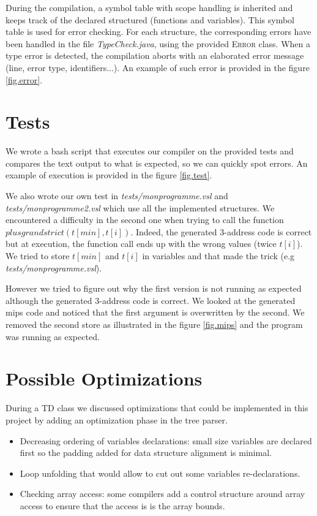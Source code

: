 \documentclass[a4paper,11pt,english]{article}
\begin{document}
During the compilation, a symbol table with scope handling is inherited and keeps track of the declared structured (functions and variables).
This symbol table is used for error checking.
For each structure, the corresponding errors have been handled in the file \textit{TypeCheck.java}, using the provided \textsc{Error} class.
When a type error is detected, the compilation aborts with an elaborated error message (line, error type, identifiers...).
An example of such error is provided in the figure \ref{fig.error}.

\section{Tests}
\label{sec.test}
We wrote a bash script that executes our compiler on the provided tests and compares the text output to what is expected, so we can quickly spot errors. An example of execution is provided in the figure \ref{fig.test}.

We also wrote our own test in \textit{tests/monprogramme.vsl} and \textit{tests/monprogramme2.vsl} which use all the implemented structures.
We encountered a difficulty in the second one when trying to call the function $plusgrandstrict(t[min], t[i])$.
Indeed, the generated 3-address code is correct but at execution, the function call ends up with the wrong values (twice $t[i]$).
We tried to store $t[min]$ and $t[i]$ in variables and that made the trick (e.g \textit{tests/monprogramme.vsl}).

However we tried to figure out why the first version is not running as expected although the generated 3-address code is correct.
We looked at the generated mips code and noticed that the first argument is overwritten by the second.
We removed the second store as illustrated in the figure \ref{fig.mips} and the program was running as expected. 

\section{Possible Optimizations}
During a TD class we discussed optimizations that could be implemented in this project by adding an optimization phase in the tree parser.
\begin{itemize}
 \item Decreasing ordering of variables declarations: small size variables are declared first so the padding added for data structure alignment is minimal.
 \item Loop unfolding that would allow to cut out some variables re-declarations.
 \item Checking array access: some compilers add a control structure around array access to ensure that the access is is the array bounds. 
\end{itemize}
\end{document}
